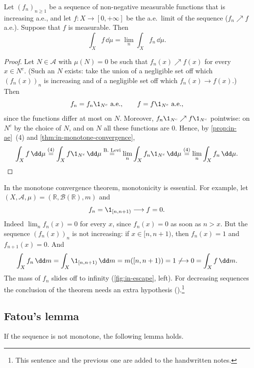 \begin{theorem}\label{thm:in-monotone-convergence-ae}
Let $(f_n)_{n\ge1}$ be a sequence of non-negative measurable functions that is increasing a.e.,
and let $f:X\to[0,+\infty]$ be the a.e.\ limit of the sequence ($f_n\nearrow f$ a.e.). Suppose
that $f$ is measurable. Then
\[
  \int_Xf\,\dd\mu=\lim_n\int_Xf_n\,\dd\mu .
\]
\end{theorem}

\begin{proof}
Let $N\in\mathcal A$ with $\mu(N)=0$ be such that $f_n(x)\nearrow f(x)$ for every $x\in N^c$. (Such
an $N$ exists: take the union of a negligible set off which $(f_n(x))_n$ is increasing and of a
negligible set off which $f_n(x)\to f(x)$.) Then
\[
  f_n=f_n\1_{N^c}\ \text{a.e.},\qquad f=f\1_{N^c}\ \text{a.e.},
\]
since the functions differ at most on $N$. Moreover, $f_n\1_{N^c}\nearrow f\1_{N^c}$ pointwise:
on $N^c$ by the choice of $N$, and on $N$ all these functions are $0$. Hence, by
\cref{prop:in-ae}~(4) and \cref{thm:in-monotone-convergence},
\[
  \int_Xf\,\dd\mu\overset{(4)}{=}\int_Xf\1_{N^c}\,\dd\mu\overset{\text{B.~Levi}}{=}\lim_n\int_Xf_n\1_{N^c}\,\dd\mu
  \overset{(4)}{=}\lim_n\int_Xf_n\,\dd\mu .\qedhere
\]
\end{proof}

\begin{remark}\label{rem:in-monotonicity-essential}
In the monotone convergence theorem, monotonicity is essential. For example, let
$(X,\mathcal A,\mu)=(\mathbb R,\mathcal B(\mathbb R),m)$ and
\[
  f_n=\1_{[n,n+1)}\longrightarrow f=0 .
\]
Indeed $\lim_nf_n(x)=0$ for every $x$, since $f_n(x)=0$ as soon as $n>x$. But the sequence
$(f_n(x))_n$ is not increasing: if $x\in[n,n+1)$, then $f_n(x)=1$ and $f_{n+1}(x)=0$. And
\[
  \int_Xf_n\,\dd m=\int_X\1_{[n,n+1)}\,\dd m=m([n,n+1))=1\not\longrightarrow0=\int_Xf\,\dd m .
\]
The mass of $f_n$ slides off to infinity (\cref{fig:in-escape}, left). For decreasing sequences
the conclusion of the theorem needs an extra hypothesis ().\footnote{This
sentence and the previous one are added to the handwritten notes.}
\end{remark}

\subsection{Fatou's lemma}\label{sec:in-fatou}

If the sequence is not monotone, the following lemma holds.


